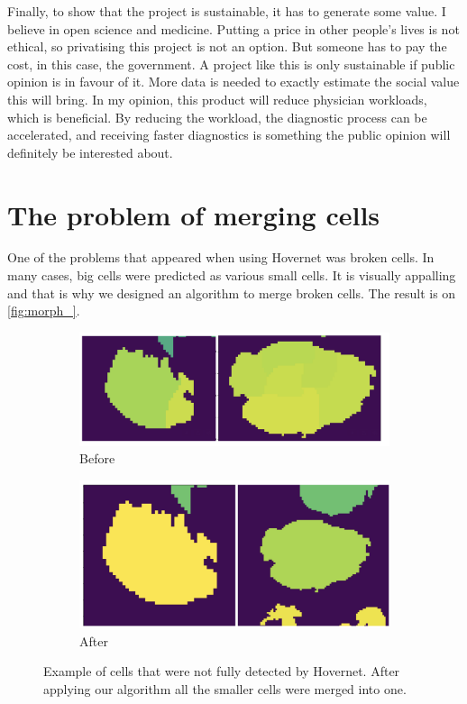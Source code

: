 Finally, to show that the project is sustainable, it has to generate some value. I believe in open science and medicine. Putting a price in other people's lives is not ethical, so privatising this project is not an option. But someone has to pay the cost, in this case, the government. A project like this is only sustainable if public opinion is in favour of it. More data is needed to exactly estimate the social value this will bring. In my opinion, this product will reduce physician workloads, which is beneficial. By reducing the workload, the diagnostic process can be accelerated, and receiving faster diagnostics is something the public opinion will definitely be interested about.

\chapter{The problem of merging cells}\label{sec:merge_cells}

One of the problems that appeared when using Hovernet was broken cells. In many cases, big cells were predicted as various small cells. It is visually appalling and that is why we designed an algorithm to merge broken cells. The result is on \autoref{fig:morph_}.

\begin{figure}[ht]
\begin{subfigure}[b]{1\textwidth}
    \centering
    \includegraphics[width=\textwidth]{imgs/morph1.png}
    \caption{Before}
    \label{fig:morph1}
\end{subfigure}
\begin{subfigure}[b]{1\textwidth}
    \centering
    \includegraphics[width=\textwidth]{imgs/morph2.png}
    \caption{After}
    \label{fig:morph2}
\end{subfigure}
\caption{Example of cells that were not fully detected by Hovernet. After applying our algorithm all the smaller cells were merged into one.}
\label{fig:morph_}
\end{figure}

